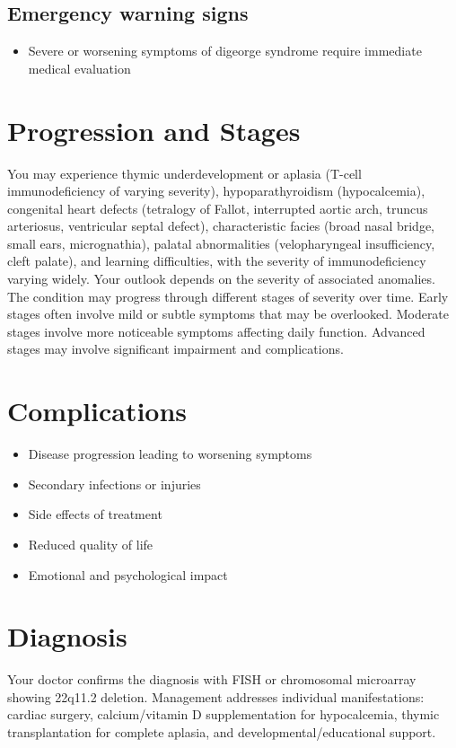 \subsection{Emergency warning signs}
\begin{itemize}[noitemsep]
  \item Severe or worsening symptoms of digeorge syndrome require immediate medical evaluation
\end{itemize}
\section{Progression and Stages}
You may experience thymic underdevelopment or aplasia (T-cell immunodeficiency of varying severity), hypoparathyroidism (hypocalcemia), congenital heart defects (tetralogy of Fallot, interrupted aortic arch, truncus arteriosus, ventricular septal defect), characteristic facies (broad nasal bridge, small ears, micrognathia), palatal abnormalities (velopharyngeal insufficiency, cleft palate), and learning difficulties, with the severity of immunodeficiency varying widely. Your outlook depends on the severity of associated anomalies. The condition may progress through different stages of severity over time. Early stages often involve mild or subtle symptoms that may be overlooked. Moderate stages involve more noticeable symptoms affecting daily function. Advanced stages may involve significant impairment and complications.
\section{Complications}
\begin{itemize}[noitemsep]
  \item Disease progression leading to worsening symptoms
  \item Secondary infections or injuries
  \item Side effects of treatment
  \item Reduced quality of life
  \item Emotional and psychological impact
\end{itemize}
\section{Diagnosis}
Your doctor confirms the diagnosis with FISH or chromosomal microarray showing 22q11.2 deletion. Management addresses individual manifestations: cardiac surgery, calcium/vitamin D supplementation for hypocalcemia, thymic transplantation for complete aplasia, and developmental/educational support.

